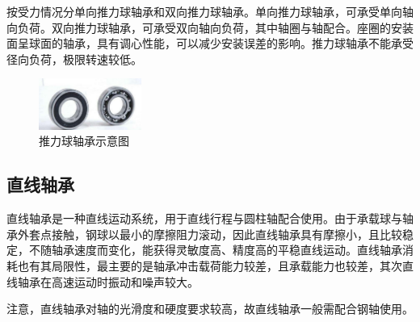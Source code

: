 \documentclass[UTF8]{article} %
\begin{document}
按受力情况分单向推力球轴承和双向推力球轴承。单向推力球轴承，可承受单向轴向负荷。双向推力球轴承，可承受双向轴向负荷，其中轴圈与轴配合。座圈的安装面呈球面的轴承，具有调心性能，可以减少安装误差的影响。推力球轴承不能承受径向负荷，极限转速较低。

\begin{figure}[h]
  \centering
  \includegraphics[width=0.3\textwidth]{zhou1.png}
  \caption{推力球轴承示意图}
\end{figure}

\subsection{直线轴承}
直线轴承是一种直线运动系统，用于直线行程与圆柱轴配合使用。由于承载球与轴承外套点接触，钢球以最小的摩擦阻力滚动，因此直线轴承具有摩擦小，且比较稳定，不随轴承速度而变化，能获得灵敏度高、精度高的平稳直线运动。直线轴承消耗也有其局限性，最主要的是轴承冲击载荷能力较差，且承载能力也较差，其次直线轴承在高速运动时振动和噪声较大。

注意，直线轴承对轴的光滑度和硬度要求较高，故直线轴承一般需配合钢轴使用。
\end{document}
